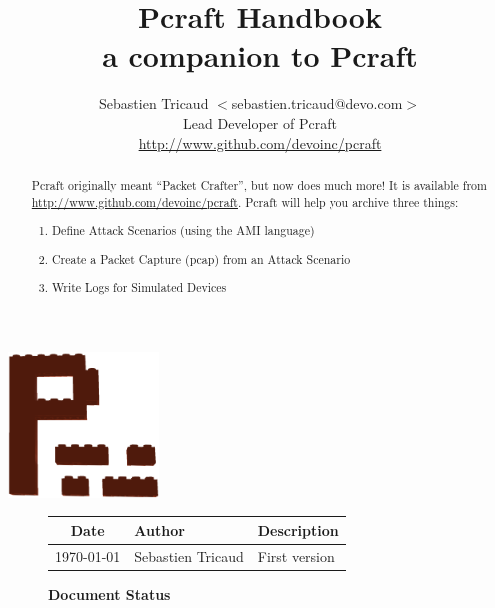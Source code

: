 \documentclass[10pt]{article}
\title{\color{PCFTorangedark} \textbf{Pcraft Handbook\\ a companion to Pcraft}}
\author{Sebastien Tricaud $<$sebastien.tricaud@devo.com$>$\\
  Lead Developer of Pcraft\\
  \url{http://www.github.com/devoinc/pcraft}
}
\begin{document}
\maketitle

\begin{center}
\includegraphics[width=4cm]{pcraft-logo.png}
\end{center}

\vspace{0.5in}

\begin{abstract}

\renewcommand{\epigraphflush}{center}
\begin{epigraphs}
\centering
\setlength{\epigraphwidth}{1.6\textwidth}
\end{epigraphs}

\vspace{1in}

Pcraft originally meant  ``Packet Crafter'', but now does much more! It is available from \url{http://www.github.com/devoinc/pcraft}. Pcraft will help you archive three things:
\begin{enumerate}
\item Define Attack Scenarios (using the AMI language)
\item Create a Packet Capture (pcap) from an Attack Scenario
\item Write Logs for Simulated Devices
\end{enumerate}

\end{abstract}

{
\begin{figure}
\begin{center}
\caption{\textbf{Document Status}}
{
\begin{tabular}{|c|l|l|}
\hline
\textbf{Date} & \textbf{Author} & \textbf{Description} \\
\hline
\today & Sebastien Tricaud & First version \\
\hline
\end{tabular}
}
\end{center}
\end{figure}
}
\end{document}
